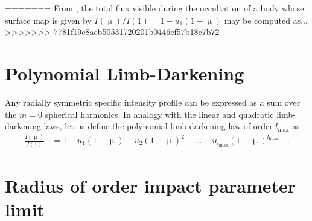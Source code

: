 \documentclass[modern]{aastex61}
\begin{document}

=======
From \citet{MandelAgol2002}, the total flux visible during the occultation of a  
body whose surface map is given by $I(\upmu)/I(1) = 1 - u_1(1 - \upmu)$ may be computed
as...
>>>>>>> 7781f19c8acb50531720201b0446cf57b18c7b72

%
\section{Polynomial Limb-Darkening}
\label{sec:quad}

Any radially symmetric specific intensity profile can be expressed as a sum
over the $m = 0$ spherical harmonics. In analogy with the linear and quadratic
limb-darkening laws, let us define the polynomial limb-darkening law of
order $l_\mathrm{max}$ as
%
%
\begin{align}
    \label{eq:polynomialld}
    \frac{I(\upmu)}{I(1)} &= 1 - u_1 (1 - \upmu) - u_2 (1 - \upmu)^2 - ... - u_{l_\mathrm{lmax}}(1 - \upmu)^{l_\mathrm{lmax}}
    \quad.
\end{align}
%


\section{Radius of order impact parameter limit}
\end{document}
